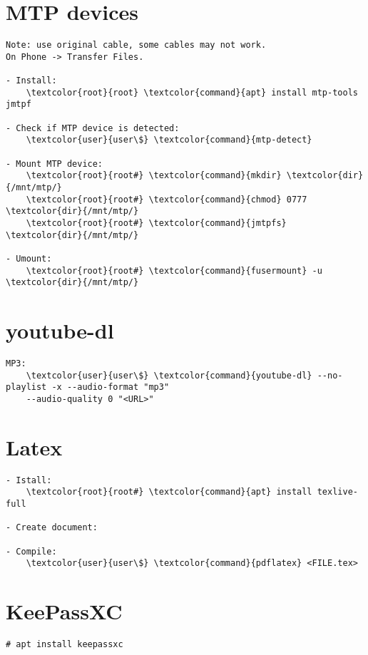 \documentclass[10pt, a4paper, onecolumn, openany]{book} %
\begin{document}
\section{MTP devices}
\begin{Verbatim}[commandchars=\\\{\}]
Note: use original cable, some cables may not work.
On Phone -> Transfer Files.

- Install:
    \textcolor{root}{root} \textcolor{command}{apt} install mtp-tools jmtpf

- Check if MTP device is detected:
    \textcolor{user}{user\$} \textcolor{command}{mtp-detect}

- Mount MTP device:
    \textcolor{root}{root#} \textcolor{command}{mkdir} \textcolor{dir}{/mnt/mtp/}
    \textcolor{root}{root#} \textcolor{command}{chmod} 0777 \textcolor{dir}{/mnt/mtp/}
    \textcolor{root}{root#} \textcolor{command}{jmtpfs} \textcolor{dir}{/mnt/mtp/}
    
- Umount:
    \textcolor{root}{root#} \textcolor{command}{fusermount} -u \textcolor{dir}{/mnt/mtp/}
\end{Verbatim}

\section{youtube-dl}
\begin{Verbatim}[commandchars=\\\{\}]
MP3:
    \textcolor{user}{user\$} \textcolor{command}{youtube-dl} --no-playlist -x --audio-format "mp3" 
    --audio-quality 0 "<URL>"
\end{Verbatim}

\section{Latex}
\begin{Verbatim}[commandchars=\\\{\}]
- Istall:
    \textcolor{root}{root#} \textcolor{command}{apt} install texlive-full
    
- Create document:

- Compile:
    \textcolor{user}{user\$} \textcolor{command}{pdflatex} <FILE.tex>
\end{Verbatim}





\section{KeePassXC}
\begin{Verbatim}[commandchars=\\\{\}]
# apt install keepassxc


\end{Verbatim}
\end{document}
